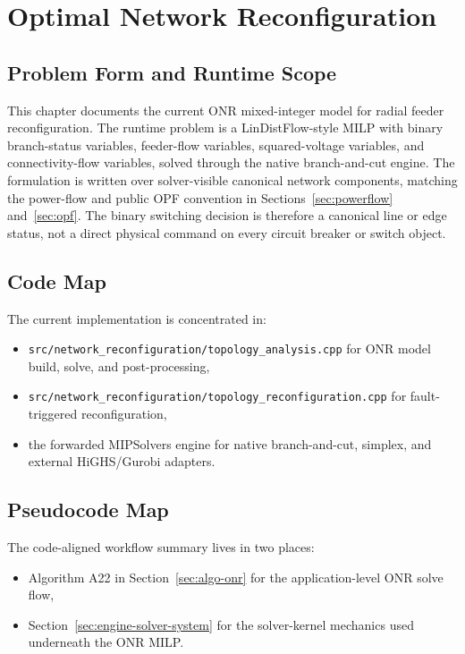 \section{Optimal Network Reconfiguration}
\label{sec:onr}

\subsection{Problem Form and Runtime Scope}

This chapter documents the current ONR mixed-integer model for radial feeder
reconfiguration.  The runtime problem is a LinDistFlow-style MILP with binary
branch-status variables, feeder-flow variables, squared-voltage variables, and
connectivity-flow variables, solved through the native branch-and-cut engine.
The formulation is written over solver-visible canonical network components,
matching the power-flow and public OPF convention in
Sections~\ref{sec:powerflow} and~\ref{sec:opf}.  The binary switching decision
is therefore a canonical line or edge status, not a direct physical command on
every circuit breaker or switch object.

\subsection{Code Map}

The current implementation is concentrated in:
\begin{itemize}
  \item \texttt{src/network\_reconfiguration/topology\_analysis.cpp} for ONR model build, solve, and post-processing,
  \item \texttt{src/network\_reconfiguration/topology\_reconfiguration.cpp} for fault-triggered reconfiguration,
  \item the forwarded MIPSolvers engine for native branch-and-cut, simplex, and
        external HiGHS/Gurobi adapters.
\end{itemize}

\subsection{Pseudocode Map}

The code-aligned workflow summary lives in two places:
\begin{itemize}
  \item Algorithm A22 in Section~\ref{sec:algo-onr} for the application-level ONR solve flow,
  \item Section~\ref{sec:engine-solver-system} for the solver-kernel mechanics used underneath the ONR MILP.
\end{itemize}

